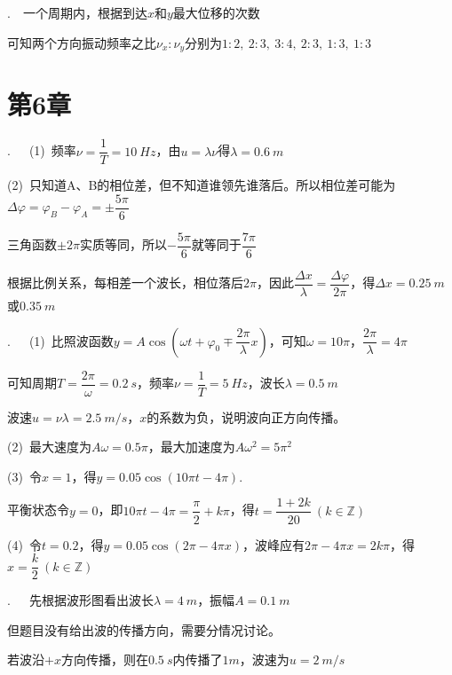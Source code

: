 \noindent\hdashrule{\textwidth}{1pt}{1pt}

.~~一个周期内，根据到达$x$和$y$最大位移的次数

可知两个方向振动频率之比$\nu_x:\nu_y$分别为$1:2,~2:3,~3:4,~2:3,~1:3,~1:3$

\noindent\hdashrule{\textwidth}{1pt}{1pt}

\section*{第6章}

.~~~(1)~频率$\nu=\dfrac{1}{T}=\SI{10}{Hz}$，由$u=\lambda \nu$得$\lambda=\SI{0.6}{m}$

(2)~只知道A、B的相位差，但不知道谁领先谁落后。所以相位差可能为$\Delta \varphi=\varphi_B-\varphi_A=\pm\dfrac{5\pi}{6}$

三角函数$\pm 2\pi$实质等同，所以$-\dfrac{5\pi}{6}$就等同于$\dfrac{7\pi}{6}$

根据比例关系，每相差一个波长，相位落后$2\pi$，因此$\dfrac{\Delta x}{\lambda}=\dfrac{\Delta \varphi}{2\pi}$，得$\Delta x=\SI{0.25}{m}$或$\SI{0.35}{m}$

\noindent\hdashrule{\textwidth}{1pt}{1pt}

.~~~(1)~比照波函数$y=A\cos{\left(\omega t+\varphi_0\mp \dfrac{2\pi}{\lambda}x\right)}$，可知$\omega=10\pi$，$\dfrac{2\pi}{\lambda}=4\pi$

可知周期$T=\dfrac{2\pi}{\omega}=\SI{0.2}{s}$，频率$\nu=\dfrac{1}{T}=\SI{5}{Hz}$，波长$\lambda=\SI{0.5}{m}$

波速$u=\nu \lambda=\SI{2.5}{m/s}$，$x$的系数为负，说明波向正方向传播。

(2)~最大速度为$A\omega=0.5\pi$，最大加速度为$A\omega^2=5\pi^2$

(3)~令$x=1$，得$y=0.05\cos{(10\pi t-4\pi)}$.

平衡状态令$y=0$，即$10\pi t-4\pi=\dfrac{\pi}{2}+k\pi$，得$t=\dfrac{1+2k}{20}~(k\in\mathbb{Z})$

(4)~令$t=0.2$，得$y=0.05\cos{(2\pi-4\pi x)}$，波峰应有$2\pi-4\pi x=2k\pi$，得$x=\dfrac{k}{2}~(k\in\mathbb{Z})$

\noindent\hdashrule{\textwidth}{1pt}{1pt}

.~~~先根据波形图看出波长$\lambda=\SI{4}{m}$，振幅$A=\SI{0.1}{m}$

但题目没有给出波的传播方向，需要分情况讨论。

若波沿$+x$方向传播，则在$\SI{0.5}{s}$内传播了$\SI{1}m$，波速为$u=\SI{2}{m/s}$

